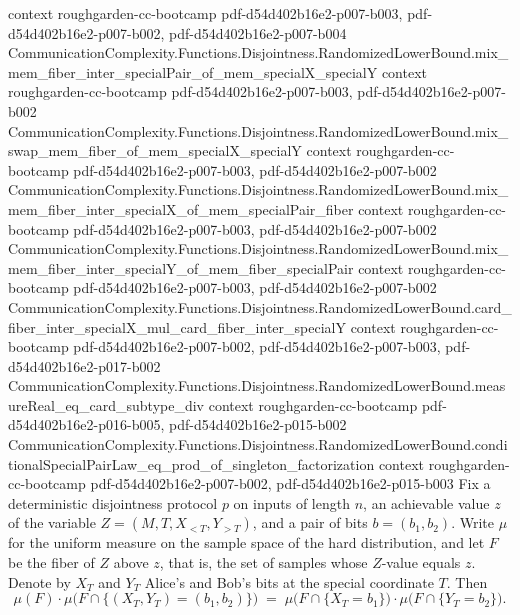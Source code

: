 \begin{theorem}
  {context}
  {roughgarden-cc-bootcamp}
  {pdf-d54d402b16e2-p007-b003,
    pdf-d54d402b16e2-p007-b002,
    pdf-d54d402b16e2-p007-b004}
\proofstep
  {CommunicationComplexity.Functions.Disjointness.RandomizedLowerBound.mix_mem_fiber_inter_specialPair_of_mem_specialX_specialY}
  {context}
  {roughgarden-cc-bootcamp}
  {pdf-d54d402b16e2-p007-b003,
    pdf-d54d402b16e2-p007-b002}
\proofstep
  {CommunicationComplexity.Functions.Disjointness.RandomizedLowerBound.mix_swap_mem_fiber_of_mem_specialX_specialY}
  {context}
  {roughgarden-cc-bootcamp}
  {pdf-d54d402b16e2-p007-b003,
    pdf-d54d402b16e2-p007-b002}
\proofstep
  {CommunicationComplexity.Functions.Disjointness.RandomizedLowerBound.mix_mem_fiber_inter_specialX_of_mem_specialPair_fiber}
  {context}
  {roughgarden-cc-bootcamp}
  {pdf-d54d402b16e2-p007-b003,
    pdf-d54d402b16e2-p007-b002}
\proofstep
  {CommunicationComplexity.Functions.Disjointness.RandomizedLowerBound.mix_mem_fiber_inter_specialY_of_mem_fiber_specialPair}
  {context}
  {roughgarden-cc-bootcamp}
  {pdf-d54d402b16e2-p007-b003,
    pdf-d54d402b16e2-p007-b002}
\proofstep
  {CommunicationComplexity.Functions.Disjointness.RandomizedLowerBound.card_fiber_inter_specialX_mul_card_fiber_inter_specialY}
  {context}
  {roughgarden-cc-bootcamp}
  {pdf-d54d402b16e2-p007-b002,
    pdf-d54d402b16e2-p007-b003,
    pdf-d54d402b16e2-p017-b002}
\proofstep
  {CommunicationComplexity.Functions.Disjointness.RandomizedLowerBound.measureReal_eq_card_subtype_div}
  {context}
  {roughgarden-cc-bootcamp}
  {pdf-d54d402b16e2-p016-b005,
    pdf-d54d402b16e2-p015-b002}
\proofstep
  {CommunicationComplexity.Functions.Disjointness.RandomizedLowerBound.conditionalSpecialPairLaw_eq_prod_of_singleton_factorization}
  {context}
  {roughgarden-cc-bootcamp}
  {pdf-d54d402b16e2-p007-b002,
    pdf-d54d402b16e2-p015-b003}
Fix a deterministic disjointness protocol $p$ on inputs of length $n$, an achievable
value $z$ of the variable $Z = (M, T, X_{<T}, Y_{>T})$, and a pair of bits $b = (b_1,
b_2)$. Write $\mu$ for the uniform measure on the sample space of the hard distribution,
and let $F$ be the fiber of $Z$ above $z$, that is, the set of samples whose $Z$-value
equals $z$. Denote by $X_T$ and $Y_T$ Alice's and Bob's bits at the special coordinate
$T$. Then
\[
\mu(F)\cdot\mu\!\big(F \cap \{(X_T, Y_T) = (b_1, b_2)\}\big) \;=\; \mu\!\big(F \cap
\{X_T = b_1\}\big)\cdot\mu\!\big(F \cap \{Y_T = b_2\}\big).
\]
\end{theorem}

